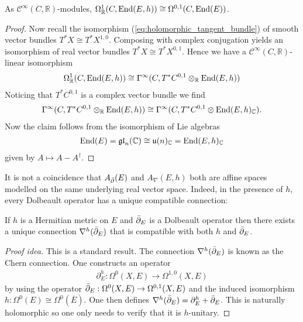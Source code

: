 \documentclass[12pt]{ociamthesis}  %
\begin{document}
\begin{lemma}\label{lem:real_vector_space_iso}
  As $\mathscr C^\infty(C,\mathbb R)$-modules,
  $\Omega^1_{\mathbb{R}}(C,\operatorname{End}(E,h))\cong\Omega^{0,1}(C,\operatorname{End}(E))$.
  \begin{proof}
    Now recall the isomorphism (\ref{eq:holomorphic_tangent_bundle}) of
    smooth vector bundles $T^* X \cong T^*X^{1,0}$. Composing with
    complex conjugation yields an isomorphism of real vector bundles
    $T^*X \cong T^*X^{0,1}$. Hence we have a
    $\mathscr C^\infty(C,\mathbb{R})$-linear isomorphism
    \begin{align*}
      \Omega^1_{\mathbb{R}}(C,\operatorname{End}(E,h))
      \cong \Gamma^\infty(C,T^*C^{0,1} \otimes_{\mathbb{R}}\operatorname{End}(E,h))
    \end{align*}
    Noticing that $T^* C^{0,1}$ is a complex vector bundle we find
    \begin{align*}
      \Gamma^\infty(C,T^*C^{0,1} \otimes_{\mathbb{R}}\operatorname{End}(E,h))
      \cong\Gamma^\infty(C,T^*C^{0,1} \otimes\operatorname{End}(E,h)_{\mathbb{C}}).
    \end{align*}
    Now the claim follows from the isomorphism of Lie algebras
    \begin{align*}
      \operatorname{End}(E)
      =\mathfrak{gl}_n(\mathbb{C})
      \cong\mathfrak u(n)_{\mathbb{C}}
      =\operatorname{End}(E,h)_{\mathbb C}
    \end{align*}
    given by $A \mapsto A-A^\dagger$.
  \end{proof}
\end{lemma}

It is not a coincidence that $A_{\bar{\partial}} (E)$ and $A_\nabla(E,h)$ both are
affine spaces modelled on the same underlying real vector space.
Indeed, in the presence of $h$, every Dolbeault operator has a unique
compatible connection:

\begin{theorem}\label{thm:chern_connection}
  If $h$ is a Hermitian metric on $E$ and ${\bar{\partial}}_E$ is a Dolbeault
  operator then there exists a unique connection $\nabla^h({\bar{\partial}}_E)$
  that is compatible with both $h$ and ${\bar{\partial}}_E$.
  \begin{proof}[Proof idea]
    This is a standard result.
    The connection $\nabla^h({\bar{\partial}}_E)$ is known as the Chern connection.
    One constructs an operator
    \begin{align*}
      \partial^h_E : \Omega^0(X,E) \to \Omega^{1,0}(X,E)
    \end{align*}
    by using the operator ${\bar{\partial}}_E : \Omega^0(X,E)\to \Omega^{0,1}(X,E)$
    and the induced isomorphism $h : \Omega^0(E) \cong \Omega^0(\overline E)$.
    One then defines $\nabla^h({\bar{\partial}}_E) = \partial^h_E + {\bar{\partial}}_E$.
    This is naturally holomorphic so one only needs to verify that it
    is $h$-unitary.
  \end{proof}
\end{theorem}
\end{document}
